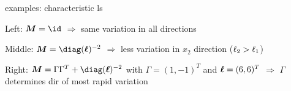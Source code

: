 \documentclass[11pt,compress,t,notes=noshow, xcolor=table]{beamer}
\begin{document}
\begin{framei}{examples: characteristic ls}



\item Left: $\bm{M} = \id$ $\Rightarrow$ same variation in all directions
\item Middle: $\bm{M} = \diag(\bm{\ls})^{-2}$ $\Rightarrow$ less variation in $x_2$ direction ($\ell_2 > \ell_1$)
\item Right: $\bm{M} = \Gamma \Gamma^T + \diag(\bm{\ls})^{-2}$ with $\Gamma = (1, -1)^T$ and $\bm{\ell} = (6, 6)^T$ $\Rightarrow$ $\Gamma$ determines dir of most rapid variation
\vfill
{}

\end{framei}

\endlecture
\end{document}
